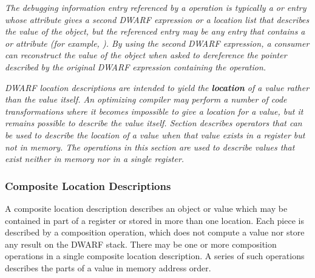 \begin{enumerate}[1. ]
\textit{The debugging information entry referenced by a 
\DWOPimplicitpointerNAME{} operation is typically a
\DWTAGvariable{} or \DWTAGformalparameter{} entry whose
\DWATlocation{} attribute gives a second DWARF expression or a
location list that describes the value of the object, but the
referenced entry may be any entry that contains a \DWATlocation{}
or \DWATconstvalue{} attribute (for example, \DWTAGdwarfprocedure).
By using the second DWARF expression, a consumer can
reconstruct the value of the object when asked to dereference
the pointer described by the original DWARF expression
containing the \DWOPimplicitpointer{} operation.}

\end{enumerate}

\textit{DWARF location descriptions 
are intended to yield the \textbf{location}
of a value rather than the value itself. An optimizing compiler
may perform a number of code transformations where it becomes
impossible to give a location for a value, but it remains possible
to describe the value itself. 
Section 
describes operators that can be used to
describe the location of a value when that value exists in a
register but not in memory. The operations in this section are
used to describe values that exist neither in memory nor in a
single register.}
 

\subsubsection{Composite Location Descriptions}
\label{chap:compositelocationdescriptions}
A composite location description describes an object or
value which may be contained in part of a register or stored
in more than one location. Each piece is described by a
composition operation, which does not compute a value nor
store any result on the DWARF stack. There may be one or
more composition operations in a single composite location
description. A series of such operations describes the parts
of a value in memory address order.


